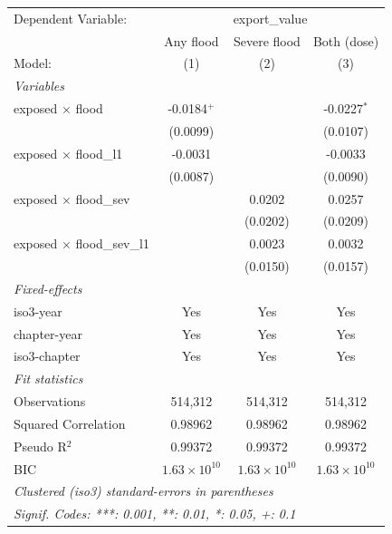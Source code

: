 
\begingroup
\centering
\begin{tabular}{lccc}
   \tabularnewline \midrule \midrule
   Dependent Variable: & \multicolumn{3}{c}{export\_value}\\
                                      & Any flood             & Severe flood          & Both (dose) \\   
   Model:                             & (1)                   & (2)                   & (3)\\  
   \midrule
   \emph{Variables}\\
   exposed $\times$ flood             & -0.0184$^{+}$         &                       & -0.0227$^{*}$\\   
                                      & (0.0099)              &                       & (0.0107)\\   
   exposed $\times$ flood\_l1         & -0.0031               &                       & -0.0033\\   
                                      & (0.0087)              &                       & (0.0090)\\   
   exposed $\times$ flood\_sev        &                       & 0.0202                & 0.0257\\   
                                      &                       & (0.0202)              & (0.0209)\\   
   exposed $\times$ flood\_sev\_l1    &                       & 0.0023                & 0.0032\\   
                                      &                       & (0.0150)              & (0.0157)\\   
   \midrule
   \emph{Fixed-effects}\\
   iso3-year                          & Yes                   & Yes                   & Yes\\  
   chapter-year                       & Yes                   & Yes                   & Yes\\  
   iso3-chapter                       & Yes                   & Yes                   & Yes\\  
   \midrule
   \emph{Fit statistics}\\
   Observations                       & 514,312               & 514,312               & 514,312\\  
   Squared Correlation                & 0.98962               & 0.98962               & 0.98962\\  
   Pseudo R$^2$                       & 0.99372               & 0.99372               & 0.99372\\  
   BIC                                & $1.63\times 10^{10}$  & $1.63\times 10^{10}$  & $1.63\times 10^{10}$\\   
   \midrule \midrule
   \multicolumn{4}{l}{\emph{Clustered (iso3) standard-errors in parentheses}}\\
   \multicolumn{4}{l}{\emph{Signif. Codes: ***: 0.001, **: 0.01, *: 0.05, +: 0.1}}\\
\end{tabular}
\par\endgroup


